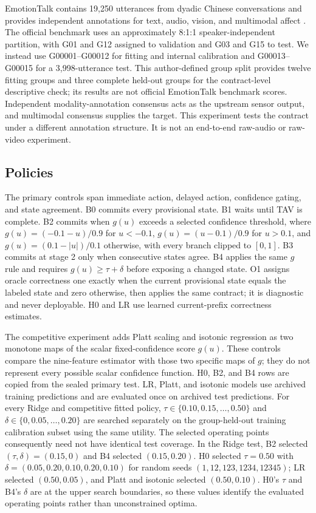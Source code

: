 \documentclass[journal]{IEEEtran}
\begin{document}
EmotionTalk contains 19,250 utterances from dyadic Chinese conversations and provides independent annotations for text, audio, vision, and multimodal affect \cite{sun2025emotiontalk}. The official benchmark uses an approximately 8:1:1 speaker-independent partition, with G01 and G12 assigned to validation and G03 and G15 to test. We instead use G00001--G00012 for fitting and internal calibration and G00013--G00015 for a 3,998-utterance test. This author-defined group split provides twelve fitting groups and three complete held-out groups for the contract-level descriptive check; its results are not official EmotionTalk benchmark scores. Independent modality-annotation consensus acts as the upstream sensor output, and multimodal consensus supplies the target. This experiment tests the contract under a different annotation structure. It is not an end-to-end raw-audio or raw-video experiment.

\subsection{Policies}

The primary controls span immediate action, delayed action, confidence gating, and state agreement. B0 commits every provisional state. B1 waits until TAV is complete. B2 commits when $g(u)$ exceeds a selected confidence threshold, where $g(u)=(-0.1-u)/0.9$ for $u<-0.1$, $g(u)=(u-0.1)/0.9$ for $u>0.1$, and $g(u)=(0.1-|u|)/0.1$ otherwise, with every branch clipped to $[0,1]$. B3 commits at stage 2 only when consecutive states agree. B4 applies the same $g$ rule and requires $g(u)\geq\tau+\delta$ before exposing a changed state. O1 assigns oracle correctness one exactly when the current provisional state equals the labeled state and zero otherwise, then applies the same contract; it is diagnostic and never deployable. H0 and LR use learned current-prefix correctness estimates.

The competitive experiment adds Platt scaling \cite{platt1999probabilistic} and isotonic regression \cite{zadrozny2002transforming} as two monotone maps of the scalar fixed-confidence score $g(u)$. These controls compare the nine-feature estimator with those two specific maps of $g$; they do not represent every possible scalar confidence function. H0, B2, and B4 rows are copied from the sealed primary test. LR, Platt, and isotonic models use archived training predictions and are evaluated once on archived test predictions. For every Ridge and competitive fitted policy, $\tau\in\{0.10,0.15,\ldots,0.50\}$ and $\delta\in\{0,0.05,\ldots,0.20\}$ are searched separately on the group-held-out training calibration subset using the same utility. The selected operating points consequently need not have identical test coverage. In the Ridge test, B2 selected $(\tau,\delta)=(0.15,0)$ and B4 selected $(0.15,0.20)$. H0 selected $\tau=0.50$ with $\delta=(0.05,0.20,0.10,0.20,0.10)$ for random seeds $(1,12,123,1234,12345)$; LR selected $(0.50,0.05)$, and Platt and isotonic selected $(0.50,0.10)$. H0's $\tau$ and B4's $\delta$ are at the upper search boundaries, so these values identify the evaluated operating points rather than unconstrained optima.
\end{document}
